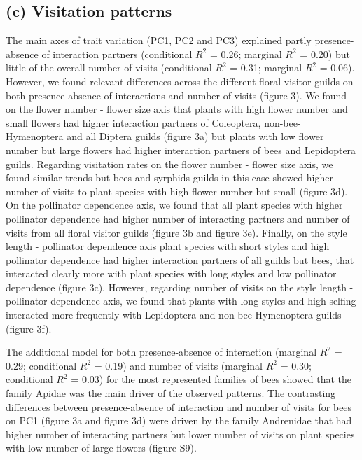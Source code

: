 \documentclass[
  12pt,
  a4paper,
]{article}
\begin{document}
\hypertarget{c-visitation-patterns}{%
\subsection{(c) Visitation patterns}\label{c-visitation-patterns}}

The main axes of trait variation (PC1, PC2 and PC3) explained partly presence-absence of interaction partners (conditional \(R^{2}\) = 0.26; marginal \(R^{2}\) = 0.20) but little of the overall number of visits (conditional \(R^{2}\) = 0.31; marginal \(R^{2}\) = 0.06). However, we found relevant differences across the different floral visitor guilds on both presence-absence of interactions and number of visits (figure 3). We found on the flower number - flower size axis that plants with high flower number and small flowers had higher interaction partners of Coleoptera, non-bee-Hymenoptera and all Diptera guilds (figure 3a) but plants with low flower number but large flowers had higher interaction partners of bees and Lepidoptera guilds. Regarding visitation rates on the flower number - flower size axis, we found similar trends but bees and syrphids guilds in this case showed higher number of visits to plant species with high flower number but small (figure 3d). On the pollinator dependence axis, we found that all plant species with higher pollinator dependence had higher number of interacting partners and number of visits from all floral visitor guilds (figure 3b and figure 3e). Finally, on the style length - pollinator dependence axis plant species with short styles and high pollinator dependence had higher interaction partners of all guilds but bees, that interacted clearly more with plant species with long styles and low pollinator dependence (figure 3c). However, regarding number of visits on the style length - pollinator dependence axis, we found that plants with long styles and high selfing interacted more frequently with Lepidoptera and non-bee-Hymenoptera guilds (figure 3f).

The additional model for both presence-absence of interaction (marginal \(R^{2}\) = 0.29; conditional \(R^{2}\) = 0.19) and number of visits (marginal \(R^{2}\) = 0.30; conditional \(R^{2}\) = 0.03) for the most represented families of bees showed that the family Apidae was the main driver of the observed patterns. The contrasting differences between presence-absence of interaction and number of visits for bees on PC1 (figure 3a and figure 3d) were driven by the family Andrenidae that had higher number of interacting partners but lower number of visits on plant species with low number of large flowers (figure S9).
\end{document}
